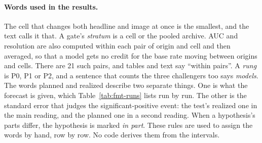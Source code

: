 \documentclass[sigconf,nonacm]{acmart}
\begin{document}
\paragraph{Words used in the results.}
The cell that changes both headline and image at once is the smallest, and the text calls it that. A gate's \emph{stratum} is a cell or the pooled archive. AUC and resolution are also computed within each pair of origin and cell and then averaged, so that a model gets no credit for the base rate moving between origins and cells. There are 21 such pairs, and tables and text say ``within pairs''. A \emph{rung} is P0, P1 or P2, and a sentence that counts the three challengers too says \emph{models}. The words planned and realized describe two separate things. One is what the forecast is given, which Table~\ref{tab:fmt-runs} lists run by run. The other is the standard error that judges the significant-positive event: the test's realized one in the main reading, and the planned one in a second reading.
When a hypothesis's parts differ, the hypothesis is marked \emph{in part}. These rules are used to assign the words by hand, row by row. No code derives them from the intervals.















\end{document}
